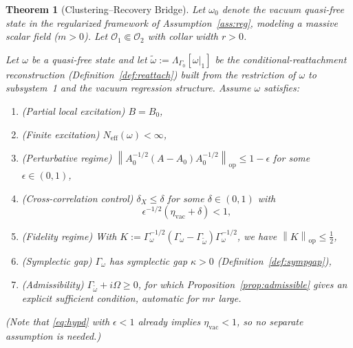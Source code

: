 \documentclass[11pt,a4paper]{article}
\theoremstyle{plain}
\newtheorem{theorem}{Theorem}[section]
\theoremstyle{definition}
\theoremstyle{remark}
\newcommand{\Oo}{\mathcal{O}}
\newcommand{\opnorm}[1]{\left\lVert #1 \right\rVert_{\mathrm{op}}}
\newcommand{\etavac}{\eta_{\mathrm{vac}}}
\newcommand{\Neff}{N_{\mathrm{eff}}}
\begin{document}
\begin{theorem}[Clustering--Recovery Bridge]\label{thm:main}
Let $\omega_0$ denote the vacuum quasi-free state in the regularized framework of
Assumption~\ref{ass:reg}, modeling a massive scalar field ($m > 0$). Let
$\Oo_1 \Subset \Oo_2$ with collar width $r > 0$.

Let $\omega$ be a quasi-free state and let
$\tilde{\omega} := \Lambda_{\Gamma_0}[\omega|_1]$ be the conditional-reattachment
reconstruction (Definition~\ref{def:reattach}) built from the restriction of
$\omega$ to subsystem~1 and the vacuum regression structure. Assume $\omega$
satisfies:
\begin{enumerate}
\item[(a)] (\emph{Partial local excitation}) $B = B_0$,
\item[(b)] (\emph{Finite excitation}) $\Neff(\omega) < \infty$,
\item[(c)] (\emph{Perturbative regime})
$\opnorm{A_0^{-1/2}(A - A_0)A_0^{-1/2}} \le 1 - \epsilon$ for some
$\epsilon \in (0,1)$,
\item[(d)] (\emph{Cross-correlation control}) $\delta_X \le \delta$ for some
$\delta \in (0,1)$ with
\begin{equation}\label{eq:hypd}
\epsilon^{-1/2}(\etavac + \delta) < 1,
\end{equation}
\item[(e)] (\emph{Fidelity regime}) With
$K := \Gamma_\omega^{-1/2}(\Gamma_\omega - \Gamma_{\tilde{\omega}})
\Gamma_\omega^{-1/2}$, we have $\opnorm{K} \le \tfrac{1}{2}$,
\item[(f)] (\emph{Symplectic gap}) $\Gamma_\omega$ has symplectic gap $\kappa > 0$
(Definition~\ref{def:sympgap}),
\item[(g)] (\emph{Admissibility}) $\Gamma_{\tilde{\omega}} + i\Omega \ge 0$, for
which Proposition~\ref{prop:admissible} gives an explicit sufficient condition,
automatic for $mr$ large.
\end{enumerate}
(Note that \eqref{eq:hypd} with $\epsilon < 1$ already implies $\etavac < 1$, so no
separate assumption is needed.)


\end{theorem}
\end{document}
